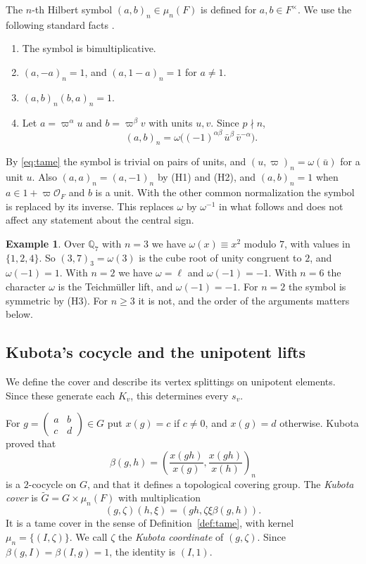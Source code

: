 \documentclass[12pt,letterpaper]{article}
\numberwithin{equation}{section}
\theoremstyle{definition}
\newtheorem{example}[theorem]{Example}
\theoremstyle{remark}
\newcommand{\OO}{\mathcal O_F}
\newcommand{\Gt}{\widetilde G}
\newcommand{\sm}[4]{\left(\begin{smallmatrix}#1&#2\\#3&#4\end{smallmatrix}\right)}
\begin{document}
The $n$-th Hilbert symbol $(a,b)_n\in\mu_n(F)$ is defined for $a,b\in F^\times$. We use the following standard facts \cite{Ne86}.
\begin{enumerate}[label=(H\arabic*),leftmargin=3em]
\item The symbol is bimultiplicative.
\item $(a,-a)_n=1$, and $(a,1-a)_n=1$ for $a\ne1$.
\item $(a,b)_n(b,a)_n=1$.
\item Let $a=\varpi^{\alpha}u$ and $b=\varpi^{\beta}v$ with units $u,v$. Since $p\nmid n$,
\begin{equation}\label{eq:tame}
 (a,b)_n=\omega\bigl((-1)^{\alpha\beta}\,\bar u^{\beta}\,\bar v^{-\alpha}\bigr).
\end{equation}
\end{enumerate}
By \eqref{eq:tame} the symbol is trivial on pairs of units, and $(u,\varpi)_n=\omega(\bar u)$ for a unit $u$. Also $(a,a)_n=(a,-1)_n$ by (H1) and (H2), and $(a,b)_n=1$ when $a\in1+\varpi\OO$ and $b$ is a unit. With the other common normalization the symbol is replaced by its inverse. This replaces $\omega$ by $\omega^{-1}$ in what follows and does not affect any statement about the central sign.

\begin{example}\label{ex:omega}
Over $\mathbb Q_7$ with $n=3$ we have $\omega(x)\equiv x^2$ modulo $7$, with values in $\{1,2,4\}$. So $(3,7)_3=\omega(3)$ is the cube root of unity congruent to $2$, and $\omega(-1)=1$. With $n=2$ we have $\omega=\ell$ and $\omega(-1)=-1$. With $n=6$ the character $\omega$ is the Teichm\"uller lift, and $\omega(-1)=-1$. For $n=2$ the symbol is symmetric by (H3). For $n\ge3$ it is not, and the order of the arguments matters below.
\end{example}

\subsection*{Kubota's cocycle and the unipotent lifts}
We define the cover and describe its vertex splittings on unipotent elements. Since these generate each $K_v$, this determines every $s_v$.

For $g=\sm abcd\in G$ put $x(g)=c$ if $c\ne0$, and $x(g)=d$ otherwise. Kubota \cite{Ku67} proved that
\begin{equation}\label{eq:kubota}
 \beta(g,h)=\left(\frac{x(gh)}{x(g)},\frac{x(gh)}{x(h)}\right)_n
\end{equation}
is a $2$-cocycle on $G$, and that it defines a topological covering group. The \emph{Kubota cover} is $\Gt=G\times\mu_n(F)$ with multiplication
\[
 (g,\zeta)(h,\xi)=(gh,\zeta\xi\beta(g,h)) .
\]
It is a tame cover in the sense of Definition~\ref{def:tame}, with kernel $\mu_n=\{(I,\zeta)\}$. We call $\zeta$ the \emph{Kubota coordinate} of $(g,\zeta)$. Since $\beta(g,I)=\beta(I,g)=1$, the identity is $(I,1)$.
\end{document}
